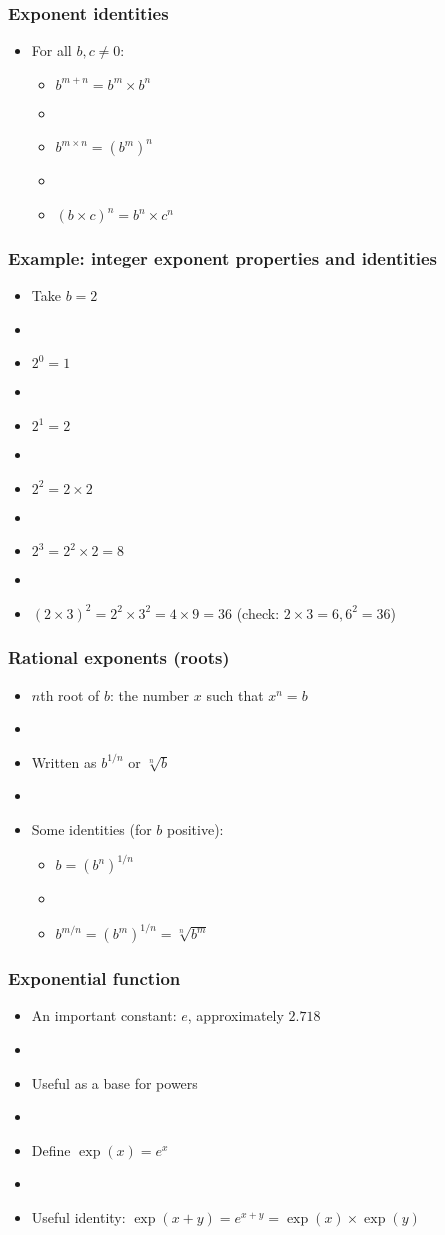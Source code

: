 \documentclass[12pt]{beamer}
\newcommand{\myframe}[1]{\begin{frame} \frametitle{#1}}
\begin{document}
\myframe{Exponent identities}
\begin{itemize}
\item For all $b,c \neq 0$:
\begin{itemize}
\item $b^{m+n} = b^m \times b^n$
\item[]
\item $b^{m \times n} = (b^m)^n$
\item[]
\item $(b\times c)^n = b^n \times c^n$
\end{itemize}
\end{itemize}
\end{frame}

\myframe{Example: integer exponent properties and identities}
\begin{itemize}
\item Take $b = 2$
\item[]
\item $2^0 = 1$
\item[]
\item $2^1 = 2$
\item[]
\item $2^2 = 2 \times 2$
\item[]
\item $2^3 = 2^2 \times 2 = 8$
\item[]
\item $(2 \times 3)^2 = 2^2 \times 3^2 = 4 \times 9 = 36$ (check: $2 \times 3 = 6, 6^2 = 36$)
\end{itemize}
\end{frame}

\myframe{Rational exponents (roots)}
\begin{itemize}
\item $n$th root of $b$: the number $x$ such that $x^n = b$ 
\item[]
\item Written as $b^{1/n}$ or $\sqrt[n]{b}$
\item[]
\item Some identities (for $b$ positive):
\begin{itemize}
\item $b = (b^n)^{1/n}$
\item[]
\item $b^{m/n} = (b^m)^{1/n} = \sqrt[n]{b^m}$
\end{itemize}
\end{itemize}
\end{frame}

\myframe{Exponential function}
\begin{itemize}
\item An important constant: $e$, approximately $2.718$
\item[]
\item Useful as a base for powers
\item[]
\item Define $\exp(x) = e^x$
\item[]
\item Useful identity: $\exp(x+y) = e^{x+y} =  \exp(x)\times \exp(y)$
\end{itemize}
\end{frame}
\end{document}
